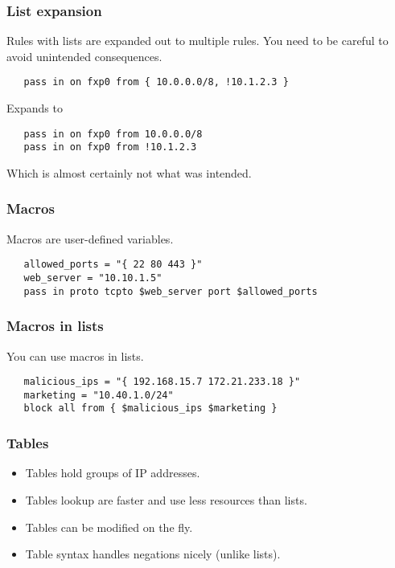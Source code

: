 \documentclass[10pt]{beamer}
\begin{document}
\begin{frame}[fragile]
  \frametitle{List expansion}
 Rules with lists are expanded out to multiple rules.  You need
 to be careful to avoid unintended consequences.
 \begin{verbatim}
   pass in on fxp0 from { 10.0.0.0/8, !10.1.2.3 }
 \end{verbatim}
 Expands to 
 \begin{verbatim}
   pass in on fxp0 from 10.0.0.0/8
   pass in on fxp0 from !10.1.2.3
 \end{verbatim}
 Which is almost certainly not what was intended.
\end{frame}


\begin{frame}[fragile]
  \frametitle{Macros}

 Macros are user-defined variables.
 \begin{verbatim}
   allowed_ports = "{ 22 80 443 }"
   web_server = "10.10.1.5"
   pass in proto tcpto $web_server port $allowed_ports
 \end{verbatim}

\end{frame}


\begin{frame}[fragile]
  \frametitle{Macros in lists}

 You can use macros in lists.
 \begin{verbatim}
   malicious_ips = "{ 192.168.15.7 172.21.233.18 }"
   marketing = "10.40.1.0/24"
   block all from { $malicious_ips $marketing }
 \end{verbatim}

\end{frame}


\begin{frame}
  \frametitle{Tables}

 \begin{itemize}
   \item Tables hold groups of IP addresses.
   \item Tables lookup are faster and use less resources than lists.
   \item Tables can be modified on the fly.
   \item Table syntax handles negations nicely (unlike lists).
 \end{itemize}

\end{frame}
\end{document}
